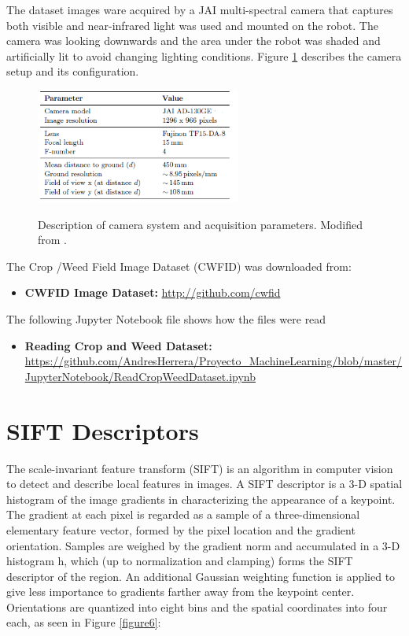 \documentclass[12pt]{article}
\numberwithin{equation}{section}
\numberwithin{table}{section}
\numberwithin{figure}{section}
\begin{document}
\noindent
The dataset images ware acquired by a JAI multi-spectral camera that captures both visible and near-infrared light was used and mounted on the robot. The camera was looking downwards and the area under the robot was shaded and artificially lit to avoid changing lighting conditions. Figure \ref{figure2} describes the camera setup and its configuration.

\begin{figure}[H] \centering
	\caption{Description of camera system and acquisition parameters. Modified from \cite{Haug2015}. }
	\includegraphics[width=0.6\textwidth]{image2.png}
	\label{figure2}
\end{figure}

\noindent
The Crop /Weed Field Image Dataset (CWFID) was downloaded from:
\begin{itemize}
	\item {\textbf{CWFID Image Dataset:} } \url{http://github.com/cwfid}
	
\end{itemize}

\noindent
The following Jupyter Notebook file shows how the files were read 

\begin{itemize}
	\item {\textbf{Reading Crop and Weed Dataset:} } \url{https://github.com/AndresHerrera/Proyecto_MachineLearning/blob/master/JupyterNotebook/ReadCropWeedDataset.ipynb}
	
\end{itemize}

\section{SIFT Descriptors} \label{sift}
The scale-invariant feature transform (SIFT) is an algorithm in computer vision to detect and describe local features in images. A SIFT descriptor is a 3-D spatial histogram of the image gradients in characterizing the appearance of a keypoint. The gradient at each pixel is regarded as a sample of a three-dimensional elementary feature vector, formed by the pixel location and the gradient orientation. Samples are weighed by the gradient norm and accumulated in a 3-D histogram h, which (up to normalization and clamping) forms the SIFT descriptor of the region. An additional Gaussian weighting function is applied to give less importance to gradients farther away from the keypoint center. Orientations are quantized into eight bins and the spatial coordinates into four each, as seen in Figure \ref{figure6}:
\end{document}
